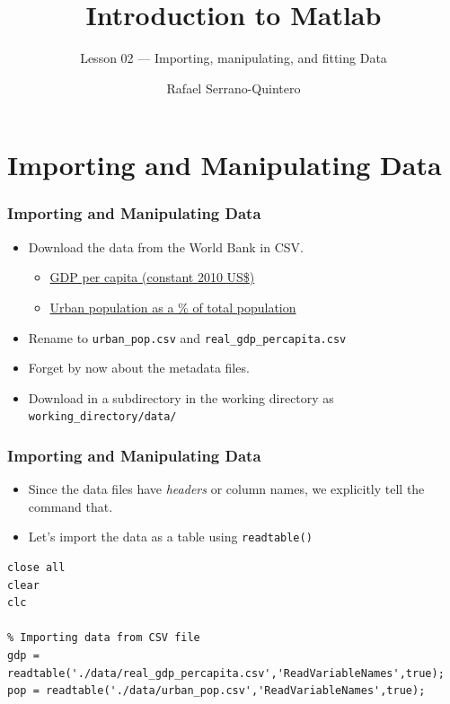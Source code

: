 \documentclass[11pt,xcolor={svgnames},aspectratio=169,usepdftitle=false,notheorems]{beamer}
\title{Introduction to Matlab}
\subtitle{Lesson 02 --- Importing, manipulating, and fitting Data}
\author{Rafael Serrano-Quintero}
\institute{Department of Economics \\ University of Barcelona}
\date{}
\begin{document}
\VerbatimFootnotes

\maketitle

\section{Importing and Manipulating Data}

\begin{frame}[fragile]
    \frametitle{Importing and Manipulating Data}
\begin{itemize}
    \item Download the data from the World Bank in CSV.
    \begin{itemize}
        \item \href{https://data.worldbank.org/indicator/NY.GDP.PCAP.KD}{GDP per capita (constant 2010 US\$)}
        \item \href{https://data.worldbank.org/indicator/SP.URB.TOTL.IN.ZS}{Urban population as a \% of total population}
    \end{itemize}
    \item Rename to \verb;urban_pop.csv; and \verb;real_gdp_percapita.csv;
    \item Forget by now about the metadata files.
    \item Download in a subdirectory in the working directory as \verb;working_directory/data/;
\end{itemize}
\end{frame}

\begin{frame}[fragile]
  \frametitle{Importing and Manipulating Data}
\begin{itemize}
  \item Since the data files have \textit{headers} or column names, we explicitly tell the command that.
  \item Let's import the data as a table using \verb;readtable();
\end{itemize}
\begin{lstlisting}
close all
clear
clc

% Importing data from CSV file
gdp = readtable('./data/real_gdp_percapita.csv','ReadVariableNames',true);
pop = readtable('./data/urban_pop.csv','ReadVariableNames',true);  
\end{lstlisting}
\end{frame}
\end{document}
